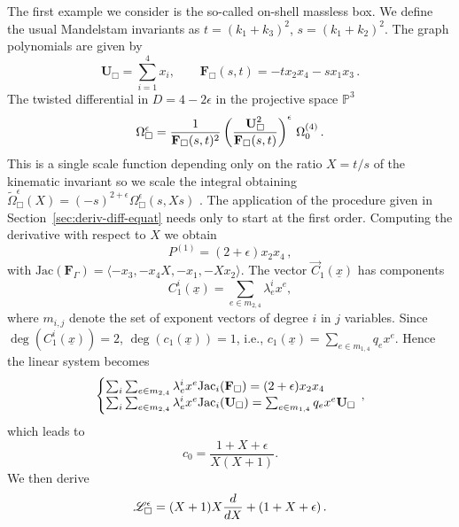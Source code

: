 \documentclass[a4paper,12pt]{article}
\numberwithin{equation}{section}
\numberwithin{figure}{section}
\begin{document}
The first example we consider is the so-called on-shell massless box. We define the usual Mandelstam invariants as $t=(k_1+k_3)^2$, $s=(k_1+k_2)^2$.  The graph polynomials are given by
\begin{equation}
	\label{e:Boxgraphpolynomials}
	\textbf{U}_{\Box}=\sum_{i=1}^4 x_i,\qquad
	\textbf{F}_{\Box}(s,t)=-t x_2x_4-sx_1x_3 \, .
\end{equation}
The twisted differential in $D=4-2\epsilon$ in the projective
space $\mathbb P^3$
\begin{equation}\label{e:OmegaBox}
	\Omega_\Box^\epsilon=   {1\over \textbf{F}_{\Box}(s,t)^2
	}\left(\textbf{U}_{\Box}^2\over \textbf{F}_{\Box}(s,t)\right)^\epsilon\,\Omega_0^{(4)} \, .
\end{equation}
This is a single scale function depending only on the ratio
$X=t/s$ of the kinematic invariant so we scale the integral obtaining
$\tilde \Omega_\Box^\epsilon(X)=(-s)^{2+\epsilon} \Omega_\Box^\epsilon(s,X s)$ .
%
The application of the procedure given in
Section~\ref{sec:deriv-diff-equat} needs only to start at the first
order. Computing the derivative with respect to $X$ we obtain 
%
\begin{equation}
P  ^{(1)}= (2+\epsilon) x_2 x_4 \, , 
\end{equation}
with $\text{Jac}(\mathbf F_\Gamma)=\langle-x_3, -x_4 X,-x_1, -X x_2  \rangle$. The  vector  $\vec C_{1}(\underline x)$ has components 
\begin{equation}
C^i_{1}(\underline x)= \sum_{e \in m_{2,4}} \lambda^i_e x^e,	
\end{equation}
where $m_{i,j}$ denote the set of exponent vectors of degree $i$ in $j$ variables. Since $\deg(C^i_{1}(\underline x))=2$, $\deg (c_1(\underline x))=1$, i.e., $c_1(\underline x)=\sum_{e\in m_{1,4}} q_e x^e$. Hence the linear system becomes
%
\begin{equation}\label{e:sysCFU-Box}
	\left\{\begin{array}{@{}l@{}}
\sum_i \sum_{e \in m_{2,4}} \lambda^i_e x^e \text{Jac}_i(\mathbf F_\Box) 
		=    (2+\epsilon) x_2 x_4\\
\sum_i\sum_{e \in m_{2,4}} \lambda^i_e x^e \text{Jac}_i(\mathbf U_\Box) = \sum_{e\in m_{1,4}} q_e x^e \textbf{U}_\Box 
	\end{array}\right.\,,
\end{equation}
which leads to 
%
\begin{equation}
	c_0= \frac{1+X+\epsilon }{X(X+1)}.
\end{equation}
We then derive
\begin{equation}\label{e:PFBox}
	\mathscr{L}_\Box^\epsilon= (X+1) X {d\over dX}+(1+X+\epsilon)  \,.
\end{equation}
\end{document}
